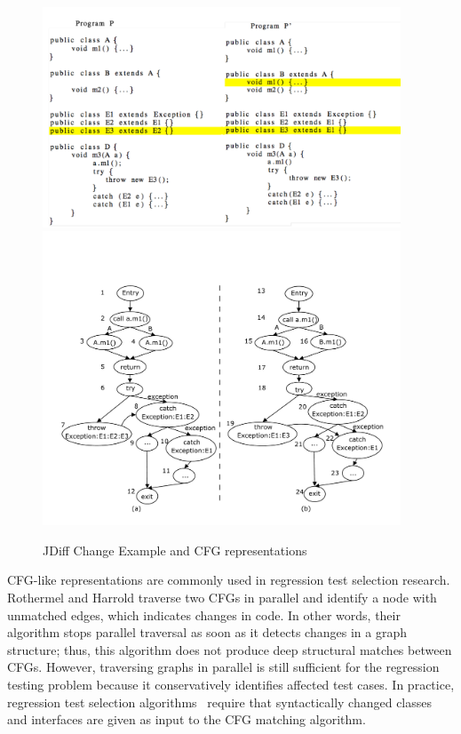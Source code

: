 \begin{figure}
\centering
\includegraphics[width=0.95\textwidth]{images/JDiffCodeExample.pdf}
\includegraphics[width=0.95\textwidth]{images/JDiffCFG.pdf}
\caption{JDiff Change Example and CFG representations} 
\label{fig:JDiff} 
\end{figure}

CFG-like representations are commonly used in regression test selection research. Rothermel and Harrold \cite{Rothermel1997} traverse two CFGs in parallel and identify a node with unmatched edges, which indicates changes in code. In other words, their algorithm stops parallel traversal as soon as it detects changes in a graph structure; thus, this algorithm does not produce deep structural matches between CFGs. However, traversing graphs in parallel is still sufficient for the regression testing problem because it conservatively identifies affected test cases. In practice, regression test selection algorithms~\cite{Harrold2001, Orso2004} require that syntactically changed classes and interfaces are given as input to the CFG matching algorithm. 

